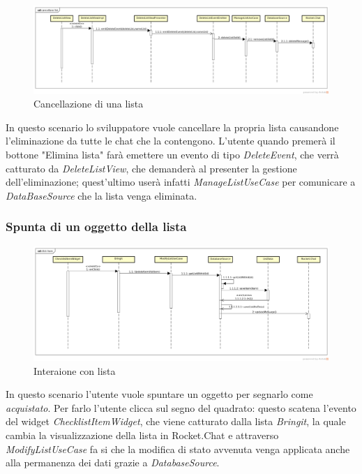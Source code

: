 \label{Cancellazione di una lista}
\begin{figure}[H]
	\centering
	\includegraphics[width=\textwidth]{Sezioni/Diagrammi/App/cancellarelist.png}
	\caption{Cancellazione di una lista}
\end{figure}

In questo scenario lo sviluppatore vuole cancellare la propria lista causandone l'eliminazione da tutte le chat che la contengono. L'utente quando premerà il bottone "Elimina lista" farà emettere un evento di tipo \textit{DeleteEvent}, che verrà catturato da \textit{DeleteListView}, che demanderà al presenter la gestione dell'eliminazione; quest'ultimo userà infatti \textit{ManageListUseCase} per comunicare a \textit{DataBaseSource} che la lista venga eliminata.

\subsubsection{Spunta di un oggetto della lista}

\label{Spunta di un oggetto della lista}
\begin{figure}[H]
	\centering
	\includegraphics[width=\textwidth]{Sezioni/Diagrammi/App/clickitem.png}
	\caption{Interaione con lista}
\end{figure}

In questo scenario l'utente vuole spuntare un oggetto per segnarlo come \textit{acquistato}.
Per farlo l'utente clicca sul segno del quadrato: questo scatena l'evento del widget \textit{ChecklistItemWidget}, che viene catturato dalla lista \textit{Bringit}, la quale cambia la visualizzazione della lista in Rocket.Chat e attraverso \textit{ModifyListUseCase} fa si che la modifica di stato avvenuta venga applicata anche alla permanenza dei dati grazie a \textit{DatabaseSource}.


